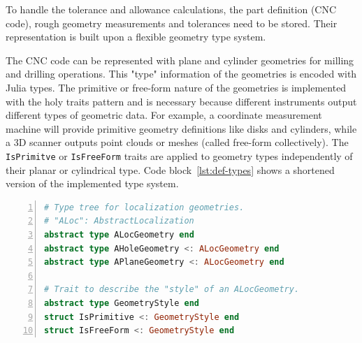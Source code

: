 \documentclass{juliacon}
\begin{document}


To handle the tolerance and allowance calculations, the part definition (CNC code), rough geometry measurements and tolerances need to be stored.
Their representation is built upon a flexible geometry type system.

The CNC code can be represented with plane and cylinder geometries for milling and drilling operations.
This "type" information of the geometries is encoded with Julia types.
The primitive or free-form nature of the geometries is implemented with the holy traits pattern and is necessary because different instruments output different types of geometric data.
For example, a coordinate measurement machine will provide primitive geometry definitions like disks and cylinders, while a 3D scanner outputs point clouds or meshes (called free-form collectively).
The \texttt{IsPrimitve} or \texttt{IsFreeForm} traits are applied to geometry types independently of their planar or cylindrical type.
Code block~\ref{lst:def-types} shows a shortened version of the implemented type system.

\begin{lstlisting}[language = Julia, numbers=left, label={lst:def-types}, caption={Shortened implementation of the type system used by \texttt{BlankLocalizationCore.jl}.}]
# Type tree for localization geometries.
# "ALoc": AbstractLocalization
abstract type ALocGeometry end
abstract type AHoleGeometry <: ALocGeometry end
abstract type APlaneGeometry <: ALocGeometry end

# Trait to describe the "style" of an ALocGeometry.
abstract type GeometryStyle end
struct IsPrimitive <: GeometryStyle end
struct IsFreeForm <: GeometryStyle end
\end{lstlisting}
\end{document}
